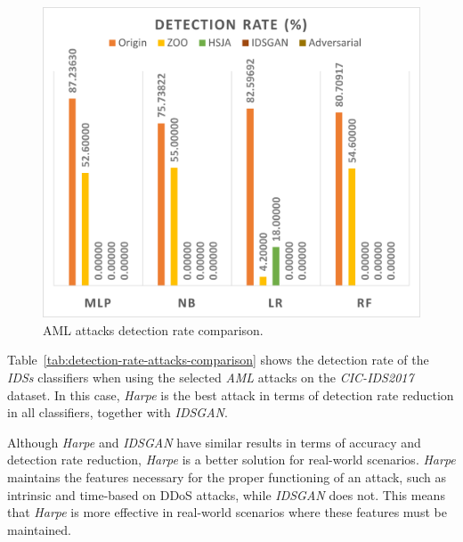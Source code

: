 \begin{figure}
    \centering
    \includegraphics[width=.95\columnwidth]{Figures/Attacks.png}
    \caption{\label{fig:attacks-comparison} AML attacks detection rate comparison.}
\end{figure}

Table~\ref{tab:detection-rate-attacks-comparison} shows the detection rate of the \textit{IDSs} classifiers when using
the selected \textit{AML} attacks on the \textit{CIC-IDS2017} dataset.
In this case, \textit{Harpe} is the best attack in terms of detection rate reduction in all classifiers, together with
\textit{IDSGAN}.

Although \textit{Harpe} and \textit{IDSGAN} have similar results in terms of accuracy and detection rate reduction,
\textit{Harpe} is a better solution for real-world scenarios.
\textit{Harpe} maintains the features necessary for the proper functioning of an attack, such as intrinsic and
time-based on DDoS attacks, while \textit{IDSGAN} does not.
This means that \textit{Harpe} is more effective in real-world scenarios where these features must be maintained.
